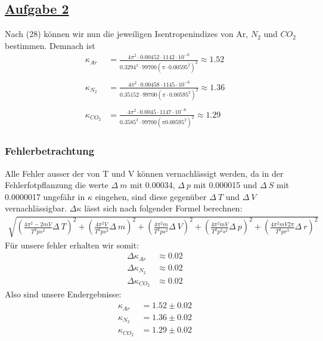\documentclass[11pt,a4paper]{article}
\begin{document}
\subsection{\underline{Aufgabe 2}}
 Nach (28) k\"onnen wir nun die jeweiligen Isentropenindizes von Ar, $N_{2}$ und $CO_{2}$
 bestimmen. Demnach ist 
 \begin{align*}
     {\kappa}_{Ar} &=\frac{4{\pi}^{2}\cdot0.00452\cdot1142\cdot{10}^{-6}}
     {{0.3294}^{2}\cdot99700{(\pi\cdot{0.00595}^{2})}^{2}} \approx 1.52 \\ \\
     {\kappa}_{{N}_{2}} &= \frac{4{\pi}^{2}\cdot0.00458\cdot1145\cdot{10}^{-6}}
     {{0.3515}{2}\cdot99700{(\pi\cdot{0.00595}^{2})}^{2}} \approx 1.36 \\ \\
     {\kappa}_{{CO}_{2}} &= \frac{4{\pi}^{2}\cdot0.0045\cdot1147\cdot{10}^{-6}}
     {{0.3585}^{2}\cdot99700{(\pi{0.00595}^{2})}^{2}} \approx 1.29
 \end{align*}
 \subsubsection{Fehlerbetrachtung}
 Alle Fehler ausser der von T und V k\"onnen vernachl\"assigt werden,
 da in der Fehlerfotpflanzung die werte $\Delta~m$ mit 0.00034, $\Delta~p$ mit 0.000015
 und $\Delta~S$ mit 0.0000017 ungef\"ahr in $\kappa$ eingehen, sind diese gegen\"uber
 $\Delta~T$ und $\Delta~V$ vernachl\"assigbar.
 $\Delta\kappa$ l\"asst sich nach folgender Formel berechnen:
 \begin{align*}
    \sqrt{{\left(
              \frac{4{\pi}^{2}-2mV}{{T}^{2}p{s}^{2}}\Delta~T
            \right)}^{2}+
            {\left(
              \frac{4{\pi}^{2}V}{{T}^{2}p{s}^{2}}\Delta~m
            \right)}^{2}+
            {\left(
              \frac{4{\pi}^{2}m}{{T}^{2}p{s}^{2}}\Delta~V
            \right)}^{2}+
            {\left(
              \frac{4{\pi}^{2}mV}{{T}^{2}{p}^{2}{s}^{2}}\Delta~p
            \right)}^{2}+
            {\left(
              \frac{4{\pi}^{2}mV2\pi}{{T}^{2}p{r}^{3}}\Delta~r
            \right)}^{2}
        }
 \end{align*}
 F\"ur unsere fehler erhalten wir somit:
 \begin{align*}
     \Delta{\kappa}_{Ar} &\approx 0.02 \\
     \Delta{\kappa}_{{N}_{2}} &\approx 0.02 \\ 
     \Delta{\kappa}_{{CO}_{2}} &\approx 0.02
 \end{align*}
 Also sind unsere Endergebnisse:
 \begin{align*}
     {\kappa}_{Ar} &= 1.52 \pm 0.02 \\
     {\kappa}_{{N}_{2}} &= 1.36 \pm 0.02 \\
     {\kappa}_{{CO}_{2}} &= 1.29 \pm 0.02
 \end{align*}
\end{document}
